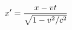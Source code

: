 \documentclass[preview]{standalone}
\begin{document}
\begin{align*}
\special{dvisvgm:raw <g id='unique000'>}x' = \frac{x - vt}{\sqrt{1 - v^2/c^2}}\special{dvisvgm:raw </g>}
\end{align*}
\end{document}
